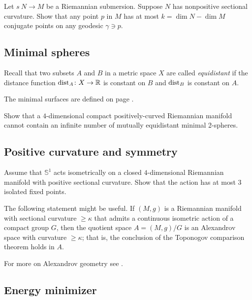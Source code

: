 \begin{pr}
Let $s\:N\to M$ be a Riemannian submersion.
Suppose $N$ has nonpositive sectional curvature.
Show that any point $p$ in $M$ has at most $k=\dim N-\dim M$ conjugate points on any geodesic $\gamma\ni p$.
\end{pr}

\subsection*{Minimal spheres}
\label{Minimal spheres}

Recall that two subsets $A$ and $B$ in a metric space $X$ are called \emph{equidistant} if the distance function $\operatorname{\rm dist}\nolimits_A\colon X\to\mathbb{R}$ is constant on $B$ and $\operatorname{\rm dist}\nolimits_B$ is constant on $A$.

The minimal surfaces are defined on page \pageref{minimal surface}.

\begin{pr}
Show that a 
$4$-dimensional
compact 
positively-curved 
Riemannian manifold 
cannot contain an infinite number of  mutually
 equidistant minimal 2-spheres.
\end{pr}


\subsection*{Positive curvature and symmetry\thm}
\label{kleiner-hopf} 

\begin{pr}
Assume that $\mathbb S^1$ acts isometrically on a closed $4$-dimensional Riemannian manifold with positive sectional curvature.
Show that the action 
has at most $3$ isolated fixed points.
\end{pr}

The following statement might be useful.
If $(M,g)$ is a Riemannian manifold with sectional curvature $\ge \kappa$ that admits a continuous isometric action of a compact group $G$, 
then the quotient space $A=(M,g)/G$ is an Alexandrov space with curvature $\ge \kappa$;
that is, the conclusion of the Toponogov comparison theorem holds in $A$. 

For more on Alexandrov geometry see \cite{akp}.

\subsection*{Energy minimizer}
\label{Energy minimizer}

